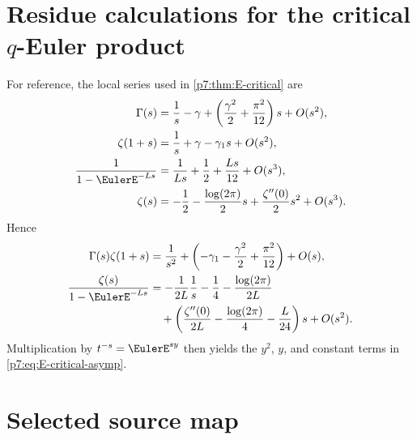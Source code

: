 \documentclass[11pt]{article}
\numberwithin{equation}{section}
\theoremstyle{definition}
\theoremstyle{remark}
\begin{document}
\endgroup

\section{Residue calculations for the critical $q$-Euler product}\label{p7:app:residues}

For reference, the local series used in \cref{p7:thm:E-critical} are
\begin{align*}
 \Gamma(s)&=\frac1s-\gamma+
 \left(\frac{\gamma^2}{2}+\frac{\pi^2}{12}\right)s+O(s^2),\\
 \zeta(1+s)&=\frac1s+\gamma-\gamma_1s+O(s^2),\\
 \frac1{1-\EulerE^{-Ls}}&=\frac1{Ls}+\frac12+\frac{Ls}{12}+O(s^3),\\
 \zeta(s)&=-\frac12-\frac{\log(2\pi)}2s+\frac{\zeta''(0)}2s^2+O(s^3).
\end{align*}
Hence
\begin{align*}
 \Gamma(s)\zeta(1+s)
 &=\frac1{s^2}+
 \left(-\gamma_1-\frac{\gamma^2}{2}+\frac{\pi^2}{12}\right)+O(s),\\
 \frac{\zeta(s)}{1-\EulerE^{-Ls}}
 &=-\frac1{2L}\frac1s
 -\frac14-\frac{\log(2\pi)}{2L}\\
 &\quad+
 \left(\frac{\zeta''(0)}{2L}
 -\frac{\log(2\pi)}4-\frac L{24}\right)s+O(s^2).
\end{align*}
Multiplication by $t^{-s}=\EulerE^{sy}$ then yields the $y^2$, $y$, and constant terms in \cref{p7:eq:E-critical-asymp}.

\section{Selected source map}
\end{document}
